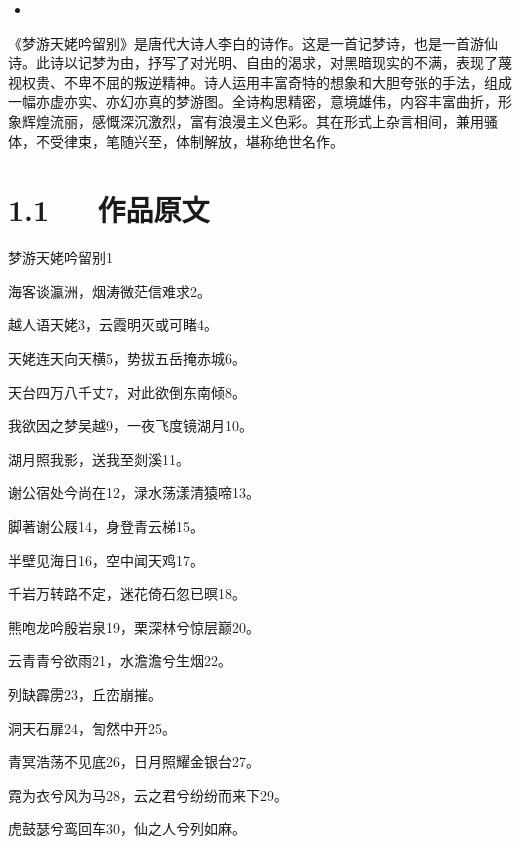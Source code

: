 \documentclass[letterpaper,12pt,english]{sphinxmanual}
\begin{document}
\begin{sphinxShadowBox}
\begin{itemize}
\begin{itemize}
\item {} 
\label{\detokenize{p01_u6563_u6587/_u674e_u767d-_u68a6_u6e38_u5929_u59e5_u541f_u7559_u522b:id17}}{\hyperref[\detokenize{p01_u6563_u6587/_u674e_u767d-_u68a6_u6e38_u5929_u59e5_u541f_u7559_u522b:id9}]{}}

\end{itemize}

\end{itemize}
\end{sphinxShadowBox}

《梦游天姥吟留别》是唐代大诗人李白的诗作。这是一首记梦诗，也是一首游仙诗。此诗以记梦为由，抒写了对光明、自由的渴求，对黑暗现实的不满，表现了蔑视权贵、不卑不屈的叛逆精神。诗人运用丰富奇特的想象和大胆夸张的手法，组成一幅亦虚亦实、亦幻亦真的梦游图。全诗构思精密，意境雄伟，内容丰富曲折，形象辉煌流丽，感慨深沉激烈，富有浪漫主义色彩。其在形式上杂言相间，兼用骚体，不受律束，笔随兴至，体制解放，堪称绝世名作。


\section{1.1   作品原文}
\label{\detokenize{p01_u6563_u6587/_u674e_u767d-_u68a6_u6e38_u5929_u59e5_u541f_u7559_u522b:id3}}
梦游天姥吟留别1

海客谈瀛洲，烟涛微茫信难求2。

越人语天姥3，云霞明灭或可睹4。

天姥连天向天横5，势拔五岳掩赤城6。

天台四万八千丈7，对此欲倒东南倾8。

我欲因之梦吴越9，一夜飞度镜湖月10。

湖月照我影，送我至剡溪11。

谢公宿处今尚在12，渌水荡漾清猿啼13。

脚著谢公屐14，身登青云梯15。

半壁见海日16，空中闻天鸡17。

千岩万转路不定，迷花倚石忽已暝18。

熊咆龙吟殷岩泉19，栗深林兮惊层巅20。

云青青兮欲雨21，水澹澹兮生烟22。

列缺霹雳23，丘峦崩摧。

洞天石扉24，訇然中开25。

青冥浩荡不见底26，日月照耀金银台27。

霓为衣兮风为马28，云之君兮纷纷而来下29。

虎鼓瑟兮鸾回车30，仙之人兮列如麻。
\end{document}
